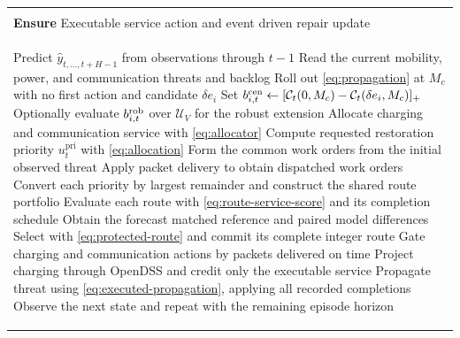 \documentclass[journal]{IEEEtran}
\begin{document}
\begin{algorithm}[t]
\caption{Physically constrained coupled rollout}
\label{alg:pcr}
\begin{tabular}{@{}p{\linewidth}@{}}
\toprule
\begin{minipage}{0.96\linewidth}
\textbf{Require} Observed history, current backlog and threat, graph $A$, budgets
$B_{\mathrm{ch}}$, $B_{\mathrm{com}}$, $B_{\mathrm{res}}$, horizon $H$, and
trained forecaster $f_{\theta}$ \\
\textbf{Ensure} Executable service action and event driven repair update
\end{minipage}
\\
\midrule
\begin{minipage}{0.96\linewidth}
\begin{algorithmic}[1]
\State Predict $\hat y_{t,\ldots,t+H-1}$ from observations through $t-1$
\State Read the current mobility, power, and communication threats and backlog
\For{each zone $i$}
\State Roll out \eqref{eq:propagation} at $M_c$ with no first action and candidate $\delta e_i$
\State Set $b_{i,t}^{\rm cen}\gets[\mathcal{C}_t(0,M_c)-\mathcal{C}_t(\delta e_i,M_c)]_+$
\State Optionally evaluate $b_{i,t}^{\rm rob}$ over $\mathcal U_V$ for the robust extension
\EndFor
\State Allocate charging and communication service with \eqref{eq:allocator}
\State Compute requested restoration priority $u_t^{\mathrm{pri}}$ with \eqref{eq:allocation}
\If{this is the first hour of the restoration episode}
\State Form the common work orders from the initial observed threat
\State Apply packet delivery to obtain dispatched work orders
\State Convert each priority by largest remainder and construct the shared route portfolio
\State Evaluate each route with \eqref{eq:route-service-score} and its completion schedule
\State Obtain the forecast matched reference and paired model differences
\State Select with \eqref{eq:protected-route} and commit its complete integer route
\EndIf
\State Gate charging and communication actions by packets delivered on time
\State Project charging through OpenDSS and credit only the executable service
\State Propagate threat using \eqref{eq:executed-propagation}, applying all recorded completions
\State Observe the next state and repeat with the remaining episode horizon
\end{algorithmic}
\end{minipage}
\\
\bottomrule
\end{tabular}
\end{algorithm}
\end{document}
